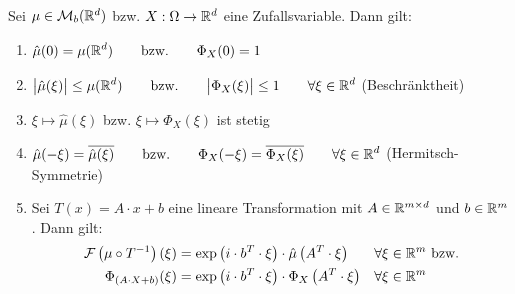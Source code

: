 \begin{theorem}\label{theorem6.1EigenschaftenDerFTCF}\enter
	Sei $\mu\in\mathcal{M}_b(\mathbb{R}^d)$ bzw. $X:\Omega\to\mathbb{R}^d$ eine Zufallsvariable. Dann gilt:
	\begin{enumerate}[label=(\alph*)]
		\item $\begin{aligned}
			\hat{\mu}(0)=\mu(\mathbb{R}^d)\qquad\text{bzw.}\qquad\Phi_X(0)=1
		\end{aligned}$
		\item $\begin{aligned}
			\big|\hat{\mu}(\xi)\big|\leq\mu(\mathbb{R}^d)\qquad\text{bzw.}\qquad\big|\Phi_X(\xi)\big|\leq 1 \qquad\forall\xi\in\mathbb{R}^d
		\end{aligned}$ (Beschränktheit)
		\item $\xi\mapsto\hat{\mu}(\xi)$ bzw. $\xi\mapsto\Phi_X(\xi)$ ist stetig
		\item $\begin{aligned}
			\hat{\mu}(-\xi)=\overline{\hat{\mu}(\xi)}\qquad\text{bzw.}\qquad\Phi_X(-\xi)=\overline{\Phi_X(\xi)}\qquad\forall\xi\in\mathbb{R}^d
		\end{aligned}$ (Hermitsch-Symmetrie)
		\item Sei $T(x)=A\cdot x+b$ eine lineare Transformation mit $A\in\mathbb{R}^{m\times d}$ und $b\in\mathbb{R}^m$. Dann gilt:
		\begin{align*}
			\mathcal{F}\left(\mu\circ T^{-1}\right)(\xi)&=\exp\left(i\cdot b^T\cdot\xi\right)\cdot\hat{\mu}\left(A^T\cdot\xi\right)
			&\forall&\xi\in\mathbb{R}^m\text{ bzw.}\\
			\Phi_{(A\cdot X+b)}(\xi)
			&=\exp\left(i\cdot b^T\cdot\xi\right)\cdot\Phi_X\left(A^T\cdot\xi\right)
			&\forall&\xi\in\mathbb{R}^m
		\end{align*}
	\end{enumerate}
\end{theorem}


